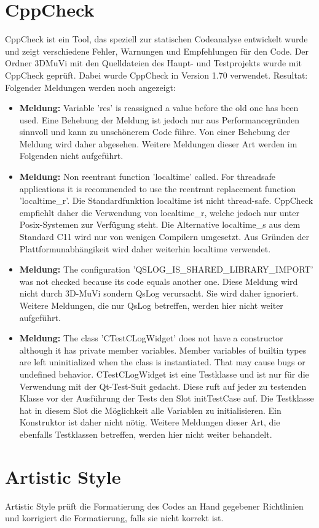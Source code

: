 \section{CppCheck}
CppCheck ist ein Tool, das speziell zur statischen Codeanalyse entwickelt wurde und zeigt verschiedene Fehler, Warnungen und Empfehlungen für den Code. Der Ordner 3DMuVi mit den Quelldateien des Haupt- und Testprojekts wurde mit CppCheck geprüft. Dabei wurde CppCheck in Version 1.70 verwendet.
Resultat: Folgender Meldungen werden noch angezeigt:
\begin{itemize}
\item \textbf{Meldung:} Variable 'res' is reassigned a value before the old one has been used.\newline
Eine Behebung der Meldung ist jedoch nur aus Performancegründen sinnvoll und kann zu unschönerem Code führe. Von einer Behebung der Meldung wird daher abgesehen. Weitere Meldungen dieser Art werden im Folgenden nicht aufgeführt.
\item \textbf{Meldung:} Non reentrant function 'localtime' called. For threadsafe applications it is recommended to use the reentrant replacement function 'localtime\_r'.\newline
Die Standardfunktion localtime ist nicht thread-safe. CppCheck empfiehlt daher die Verwendung von localtime\_r, welche jedoch nur unter Posix-Systemen zur Verfügung steht. Die Alternative localtime\_s aus dem Standard C11 wird nur von wenigen Compilern umgesetzt. Aus Gründen der Plattformunabhängikeit wird daher weiterhin localtime verwendet.
\item \textbf{Meldung:} The configuration 'QSLOG\_IS\_SHARED\_LIBRARY\_IMPORT' was not checked because its code equals another one.\newline
Diese Meldung wird nicht durch 3D-MuVi sondern QsLog verursacht. Sie wird daher ignoriert. Weitere Meldungen, die nur QsLog betreffen, werden hier nicht weiter aufgeführt.
\item \textbf{Meldung:} The class 'CTestCLogWidget' does not have a constructor although it has private member variables. Member variables of builtin types are left uninitialized when the class is instantiated. That may cause bugs or undefined behavior.\newline
CTestCLogWidget ist eine Testklasse und ist nur für die Verwendung mit der Qt-Test-Suit gedacht. Diese ruft auf jeder zu testenden Klasse vor der Ausführung der Tests den Slot initTestCase auf. Die Testklasse hat in diesem Slot die Möglichkeit alle Variablen zu initialisieren. Ein Konstruktor ist daher nicht nötig. Weitere Meldungen dieser Art, die ebenfalls Testklassen betreffen, werden hier nicht weiter behandelt.
\end{itemize}

\section{Artistic Style}
Artistic Style prüft die Formatierung des Codes an Hand gegebener Richtlinien und korrigiert die Formatierung, falls sie nicht korrekt ist. 